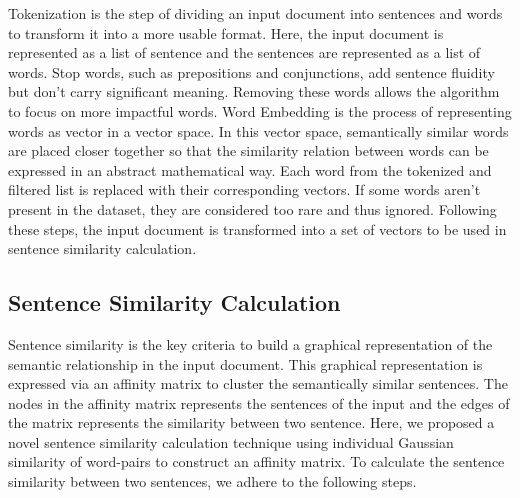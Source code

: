 \documentclass[acmlarge]{acmart}
\begin{document}
Tokenization is the step of dividing an input document into sentences and words to transform it into a more usable format. Here, the input document is represented as a list of sentence and the sentences are represented as a list of words. Stop words, such as prepositions and conjunctions, add sentence fluidity but don’t carry significant meaning. Removing these words allows the algorithm to focus on more impactful words. 
Word Embedding is the process of representing words as vector in a vector space. In this vector space, semantically similar words are placed closer together so that the similarity relation between words can be expressed in an abstract mathematical way. 
Each word from the tokenized and filtered list is replaced with their corresponding vectors. If some words aren't present in the dataset, they are considered too rare and thus ignored. Following these steps, the input document is transformed into a set of vectors to be used in sentence similarity calculation. 

\subsection{Sentence Similarity Calculation}\label{subsec:sentence-similarity-calculation}
Sentence similarity is the key criteria to build a graphical representation of the semantic relationship in the input document. This graphical representation is expressed via an affinity matrix to cluster the semantically similar sentences. The nodes in the affinity matrix represents the sentences of the input and the edges of the matrix represents the similarity between two sentence. Here, we proposed a novel sentence similarity calculation technique using individual Gaussian similarity of word-pairs to construct an affinity matrix. To calculate the sentence similarity between two sentences, we adhere to the following steps.
\end{document}
